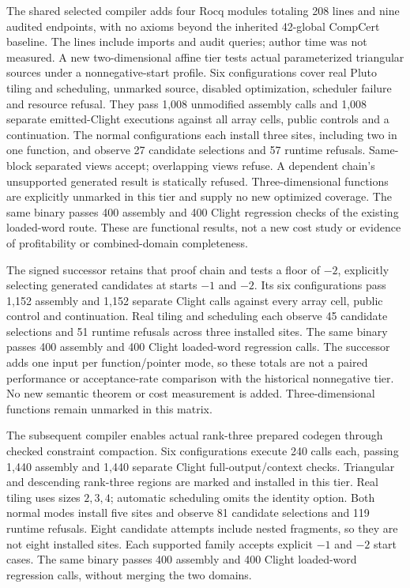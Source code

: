 
The shared selected compiler adds four Rocq modules totaling 208 lines and nine
audited endpoints, with no axioms beyond the inherited 42-global CompCert
baseline. The lines include imports and audit queries; author time was not
measured. A new two-dimensional affine tier tests actual parameterized triangular
sources under a nonnegative-start profile. Six configurations cover real Pluto
tiling and scheduling, unmarked source, disabled optimization, scheduler failure
and resource refusal. They pass 1,008 unmodified assembly calls and 1,008 separate
emitted-Clight executions against all array cells, public controls and a
continuation. The normal configurations each install three sites, including two
in one function, and observe 27 candidate selections and 57 runtime refusals.
Same-block separated views accept; overlapping views refuse. A dependent chain's
unsupported generated result is statically refused. Three-dimensional functions
are explicitly unmarked in this tier and supply no new optimized coverage.
The same binary passes 400 assembly and 400 Clight regression checks of the
existing loaded-word route. These are functional results, not a new cost study
or evidence of profitability or combined-domain completeness.

The signed successor retains that proof chain and tests a floor of $-2$,
explicitly selecting generated candidates at starts $-1$ and $-2$. Its six
configurations pass 1,152 assembly and 1,152 separate Clight calls against every
array cell, public control and continuation. Real tiling and scheduling each
observe 45 candidate selections and 51 runtime refusals across three installed
sites. The same binary passes 400 assembly and 400 Clight loaded-word regression
calls. The successor adds one input per function/pointer mode, so these totals
are not a paired performance or acceptance-rate comparison with the historical
nonnegative tier. No new semantic theorem or cost measurement is added.
Three-dimensional functions remain unmarked in this matrix.

The subsequent compiler enables actual rank-three prepared codegen through
checked constraint compaction. Six configurations execute 240 calls each,
passing 1,440 assembly and 1,440 separate Clight full-output/context checks.
Triangular and descending rank-three regions are marked and installed in this
tier. Real tiling uses sizes $2,3,4$; automatic scheduling omits
the identity option. Both normal modes install five sites and observe 81
candidate selections and 119 runtime refusals. Eight candidate attempts include
nested fragments, so they are not eight installed sites. Each supported family
accepts explicit $-1$ and $-2$ start cases. The same binary passes 400 assembly
and 400 Clight loaded-word regression calls, without merging the two domains.

